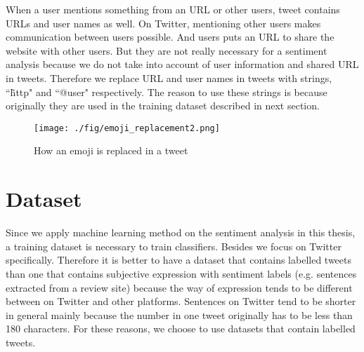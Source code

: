 When a user mentions something from an URL or other users, tweet contains URLs and user names as well.
On Twitter, mentioning other users makes communication between users possible.
And users puts an URL to share the website with other users.
But they are not really necessary for a sentiment analysis because we do not take into account of user information and shared URL in tweets.
Therefore we replace URL and user names in tweets with strings, ``\~http" and ``@user" respectively.
The reason to use these strings is because originally they are used in the training dataset described in next section.

\begin{figure}
	\centering
	\texttt{[image: ./fig/emoji\_replacement2.png]}
	\caption{How an emoji is replaced in a tweet}
	\label{fig:emoji_replacement}
\end{figure}

\section{Dataset}\label{sec:dataset}
Since we apply machine learning method on the sentiment analysis in this thesis, a training dataset is necessary to train classifiers.
Besides we focus on Twitter specifically.
Therefore it is better to have a dataset that contains labelled tweets than one that contains subjective expression with sentiment labels (e.g. sentences extracted from a review site) because the way of expression tends to be different between on Twitter and other platforms.
Sentences on Twitter tend to be shorter in general mainly because the number in one tweet originally has to be less than 180 characters.
For these reasons, we choose to use datasets that contain labelled tweets.  

